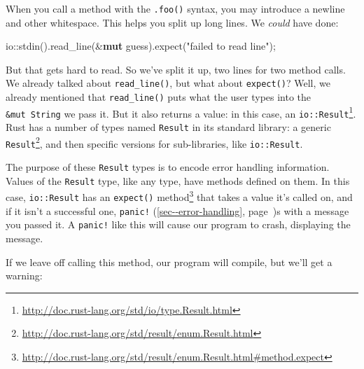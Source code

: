 \documentclass[a4paper,]{book}
\renewcommand*{\hyperref}[2][\ar]{%
  \def\ar{#2}%
  #2 (\autoref{#1}, page~\pageref{#1})}
\newenvironment{Shaded}{\begin{snugshade}}{\end{snugshade}}
\newcommand{\KeywordTok}[1]{\textcolor[rgb]{0.13,0.29,0.53}{\textbf{{#1}}}}
\newcommand{\StringTok}[1]{\textcolor[rgb]{0.31,0.60,0.02}{{#1}}}
\newcommand{\CommentTok}[1]{\textcolor[rgb]{0.56,0.35,0.01}{\textit{{#1}}}}
\newcommand{\NormalTok}[1]{{#1}}
\renewcommand{\href}[2]{#2\footnote{\url{#1}}}
\begin{document}
When you call a method with the \texttt{.foo()} syntax, you may
introduce a newline and other whitespace. This helps you split up long
lines. We \emph{could} have done:

\begin{Shaded}
\begin{Highlighting}[]
    \NormalTok{io::stdin().read_line(&}\KeywordTok{mut} \NormalTok{guess).expect(}\StringTok{"failed to read line"}\NormalTok{);}
\end{Highlighting}
\end{Shaded}

But that gets hard to read. So we've split it up, two lines for two
method calls. We already talked about \texttt{read\_line()}, but what
about \texttt{expect()}? Well, we already mentioned that
\texttt{read\_line()} puts what the user types into the
\texttt{\&mut\ String} we pass it. But it also returns a value: in this
case, an
\href{http://doc.rust-lang.org/std/io/type.Result.html}{\texttt{io::Result}}.
Rust has a number of types named \texttt{Result} in its standard
library: a generic
\href{http://doc.rust-lang.org/std/result/enum.Result.html}{\texttt{Result}},
and then specific versions for sub-libraries, like \texttt{io::Result}.

The purpose of these \texttt{Result} types is to encode error handling
information. Values of the \texttt{Result} type, like any type, have
methods defined on them. In this case, \texttt{io::Result} has an
\href{http://doc.rust-lang.org/std/result/enum.Result.html\#method.expect}{\texttt{expect()}
method} that takes a value it's called on, and if it isn't a successful
one, \hyperref[sec--error-handling]{\texttt{panic!}}s with a message you
passed it. A \texttt{panic!} like this will cause our program to crash,
displaying the message.

If we leave off calling this method, our program will compile, but we'll
get a warning:

\begin{Shaded}
\end{Shaded}
\end{document}
